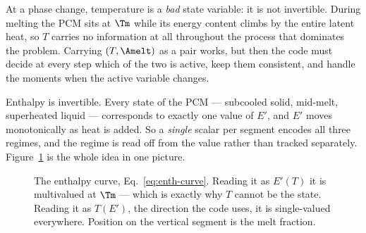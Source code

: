 At a phase change, temperature is a \emph{bad} state variable: it is not
invertible. During melting the PCM sits at $\Tm$ while its energy content
climbs by the entire latent heat, so $T$ carries no information at all
throughout the process that dominates the problem. Carrying $(T, \Amelt)$ as a
pair works, but then the code must decide at every step which of the two is
active, keep them consistent, and handle the moments when the active variable
changes.

Enthalpy is invertible. Every state of the PCM --- subcooled solid, mid-melt,
superheated liquid --- corresponds to exactly one value of $E'$, and $E'$ moves
monotonically as heat is added. So a \emph{single} scalar per segment encodes
all three regimes, and the regime is read off from the value rather than tracked
separately. Figure~\ref{fig:enthalpy-curve} is the whole idea in one picture.

\begin{figure}[htbp]
\centering
{}
\caption{The enthalpy curve, Eq.~\eqref{eq:enth-curve}. Reading it as
$E'(T)$ it is multivalued at $\Tm$ --- which is exactly why $T$ cannot be the
state. Reading it as $T(E')$, the direction the code uses, it is single-valued
everywhere. Position on the vertical segment is the melt fraction.}
\label{fig:enthalpy-curve}
\end{figure}


